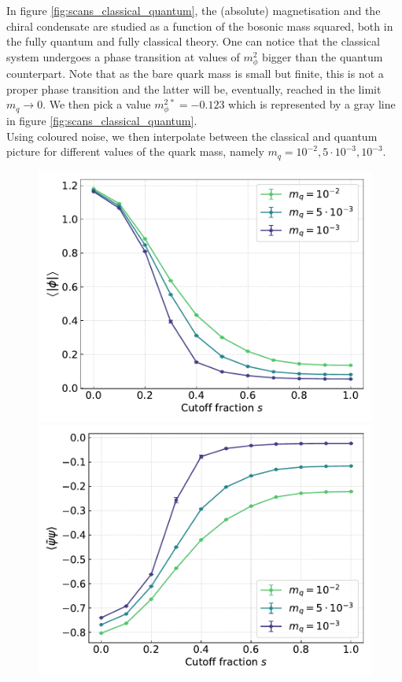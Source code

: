 In figure \ref{fig:scans_classical_quantum}, the (absolute) magnetisation and the chiral condensate are studied as a function of the bosonic mass squared, both in the fully quantum and fully classical theory. One can notice that the classical system undergoes a phase transition at values of $m_\phi^2$ bigger than the quantum counterpart. Note that as the bare quark mass is small but finite, this is not a proper phase transition and the latter will be, eventually, reached in the limit $m_q \to 0$. We then pick a value $m_\phi^{2 \, *} = -0.123$ which is represented by a gray line in figure \ref{fig:scans_classical_quantum}. \\
Using coloured noise, we then interpolate between the classical and quantum picture for different values of the quark mass, namely $m_q = 10^{-2}, 5 \cdot 10^{-3}, 10^{-3}$.
\begin{figure}[h!]
\centering
\begin{minipage}{0.45\textwidth}	
	\includegraphics[scale=0.48]{figures/chiral_PT/magnetisation.pdf}
\end{minipage}
\hfill
\begin{minipage}{0.45\textwidth}	
	\includegraphics[scale=0.48]{figures/chiral_PT/condensate.pdf}

\end{minipage}
\end{figure}
